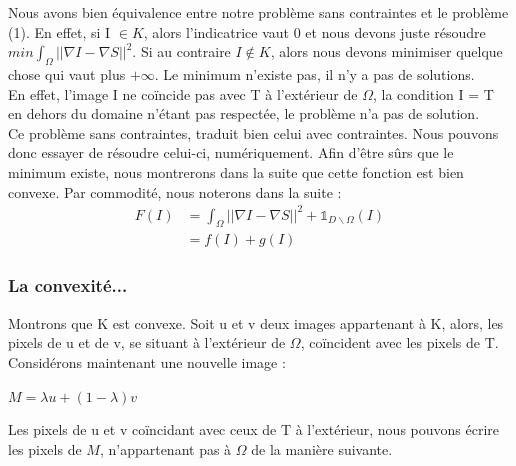 Nous avons bien équivalence entre notre problème sans contraintes et le problème (1). En effet, si I $\in K$, alors l'indicatrice vaut 0 et nous devons juste résoudre $min \int_\Omega ||\nabla I - \nabla S||^2 $. Si au contraire $I \notin K$, alors nous devons minimiser quelque chose qui vaut plus $+\infty$. Le minimum n'existe pas, il n'y a pas de solutions.\\
 En effet, l'image I ne coïncide pas avec T à l'extérieur de $\Omega$,  la condition I = T en dehors du domaine n'étant pas respectée, le problème n'a pas de solution. \\
 Ce problème sans contraintes, traduit bien celui avec contraintes. Nous pouvons donc essayer de résoudre celui-ci, numériquement. Afin d'être sûrs que le minimum existe, nous montrerons dans la suite que cette fonction est bien convexe. 
 Par commodité, nous noterons dans la suite : 
 \begin{equation*}
 \begin{aligned}
 F(I) &=   \int_\Omega ||\nabla I - \nabla S||^2 + \mathbb{1} _{D \backslash \Omega } (I) \\
 & = f(I)+ g(I)
 \end{aligned}
 \end{equation*}
\subsubsection{La convexité...}
Montrons que K est convexe. 
Soit u et v deux images appartenant à K, alors, les pixels de u et de v, se situant à l'extérieur de $\Omega$, coïncident avec les pixels de T. \\
Considérons maintenant une nouvelle image : 
\begin{center}
$M = \lambda u+(1-\lambda)v$
\end{center}
Les pixels de u et v coïncidant avec ceux de T à l'extérieur, nous pouvons écrire les pixels de $M$, n'appartenant pas à $\Omega$ de la manière suivante. \\

